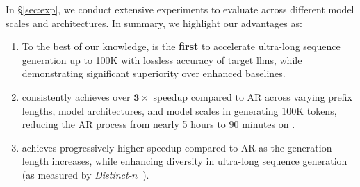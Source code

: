 In \S \ref{sec:exp}, we conduct extensive experiments to evaluate \ours across different model scales and architectures.
In summary, we highlight our advantages as:
\begin{enumerate}[leftmargin=*, noitemsep,topsep=0pt]
\item  To the best of our knowledge, \ours is the \textbf{first} to accelerate ultra-long sequence generation up to 100K with lossless accuracy of target \acp{llm}, while demonstrating significant superiority over enhanced baselines.
\item \ours consistently achieves over $\mathbf{3\times}$ speedup compared to AR across varying prefix lengths, model architectures, and model scales in generating 100K tokens, reducing the AR process from nearly 5 hours to 90 minutes on \llama. 
\item \ours achieves progressively higher speedup compared to AR as the generation length increases, while enhancing diversity in ultra-long sequence generation (as measured by \textit{Distinct-$n$}~\citep{distinctn}).
\end{enumerate}

